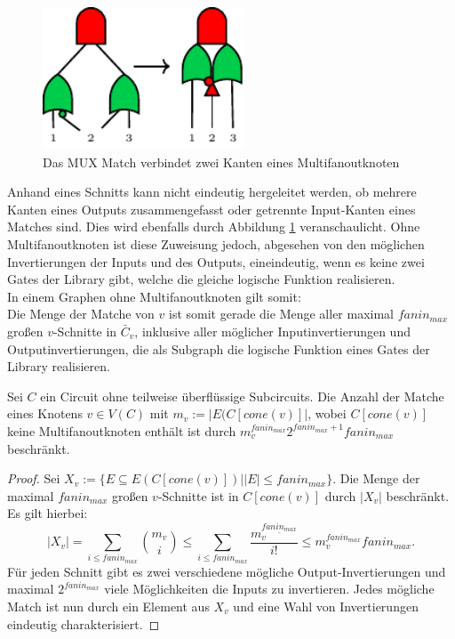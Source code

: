 \documentclass[11pt, a4paper, german]{article}
\begin{document}
\begin{figure}
		\includegraphics[width = 6cm]{pictures/compiled/mux_match}
		\caption{Das MUX Match verbindet zwei Kanten eines Multifanoutknoten}
		\label{bild:mux_match}
\end{figure}
\newpage
Anhand eines Schnitts kann nicht eindeutig hergeleitet werden, ob mehrere Kanten eines Outputs zusammengefasst oder getrennte Input-Kanten eines Matches sind. Dies wird ebenfalls durch Abbildung \ref{bild:mux_match} veranschaulicht. Ohne Multifanoutknoten ist diese Zuweisung jedoch, abgesehen von den möglichen Invertierungen der Inputs und des Outputs, eineindeutig, wenn es keine zwei Gates der Library gibt, welche die gleiche  logische Funktion realisieren.\\
In einem Graphen ohne Multifanoutknoten gilt somit: \\
Die Menge der Matche von $v$ ist somit gerade die Menge aller maximal $fanin_{max}$ großen $v$-Schnitte in $\bar{C}_v$, inklusive aller möglicher Inputinvertierungen und Outputinvertierungen, die als Subgraph die logische Funktion eines Gates der Library realisieren.
\begin{cor}\label{cor:anz_matche_einfach}
Sei $C$ ein Circuit ohne teilweise überflüssige Subcircuits. Die Anzahl der Matche eines Knotens $v\in V(C)$ mit $m_v := |E(C[cone(v)]|$, wobei $C[cone(v)]$ keine Multifanoutknoten enthält ist durch $m_v^{fanin_{max}} 2^{fanin_{max}+1} fanin_{max}$ beschränkt.
\end{cor}
\begin{proof}
Sei  $X_v:= \{ E \subseteq E(C[cone(v)]) | |E|\leq fanin_{max}  \}$. Die Menge der maximal $fanin_{max}$ großen $v$-Schnitte ist in $C[cone(v)]$ durch $ |X_v|$ beschränkt. Es gilt hierbei:
\[ |X_v| =\sum\limits_{i \leq fanin_{max}} \binom{m_v}{i} \leq  \sum\limits_{i \leq fanin_{max}}\dfrac{m_v^{\underline{fanin_{max}}}}{i!} \leq m_v^{fanin_{max}} fanin_{max} .\]
Für jeden Schnitt gibt es zwei verschiedene mögliche Output-Invertierungen und maximal  $2^{fanin_{max}}$ viele Möglichkeiten die Inputs zu invertieren. Jedes mögliche Match ist nun durch ein Element aus $X_v$ und eine Wahl von Invertierungen eindeutig charakterisiert.
\end{proof}
\end{document}
